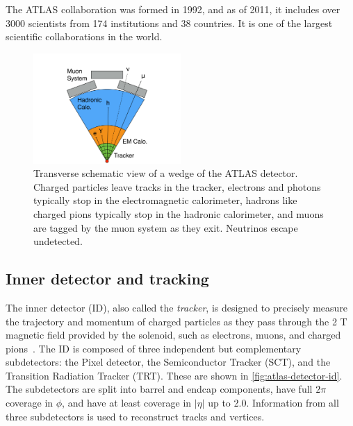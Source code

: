 The ATLAS collaboration was formed in 1992, and as of 2011, it includes over 3000 scientists from 174 institutions and 38 countries. It is one of the largest scientific collaborations in the world.

\begin{figure}[tp]
  \centering
  \includegraphics[width=0.5\textwidth]{figures/lhc-atlas/atlas-wedge-cartoon}
  \caption{Transverse schematic view of a wedge of the ATLAS detector. Charged particles leave tracks in the tracker, electrons and photons typically stop in the electromagnetic calorimeter, hadrons like charged pions typically stop in the hadronic calorimeter, and muons are tagged by the muon system as they exit. Neutrinos escape undetected.}
  \label{fig:atlas-wedge}
\end{figure}

\subsection{Inner detector and tracking}

The inner detector (ID), also called the \textit{tracker}, is designed to precisely measure the trajectory and momentum of charged particles as they pass through the 2 T magnetic field provided by the solenoid, such as electrons, muons, and charged pions~\cite{cern-jinst-atlas}. The ID is composed of three independent but complementary subdetectors: the Pixel detector, the Semiconductor Tracker (SCT), and the Transition Radiation Tracker (TRT). These are shown in \cref{fig:atlas-detector-id}. The subdetectors are split into barrel and endcap components, have full $2\pi$ coverage in $\phi$, and have at least coverage in $|\eta|$ up to 2.0. Information from all three subdetectors is used to reconstruct tracks and vertices.

